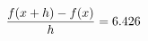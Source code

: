 \documentclass[preview]{standalone}
\begin{document}
\begin{align*}
\special{dvisvgm:raw <g id='unique000'>}\frac{f(x+h)-f(x)}{h} = 6.426\special{dvisvgm:raw </g>}
\end{align*}
\end{document}
